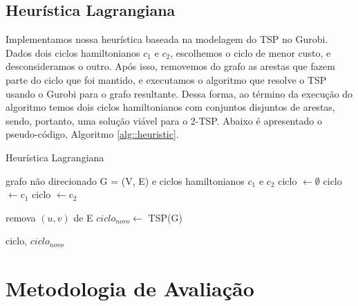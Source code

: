 \documentclass{TEMA}
\begin{document}
\subsection{Heurística Lagrangiana}

Implementamos nossa heurística baseada na modelagem do TSP no Gurobi. Dados dois ciclos hamiltonianos $c_1$ e $c_2$, escolhemos o ciclo de menor custo, e desconsideramos o outro. Após isso, removemos do grafo as arestas que fazem parte do ciclo que foi mantido, e executamos o algoritmo que resolve o TSP usando o Gurobi para o grafo resultante. Dessa forma, ao término da execução do algoritmo temos dois ciclos hamiltonianos com conjuntos disjuntos de arestas, sendo, portanto, uma solução viável para o 2-TSP. Abaixo é apresentado o pseudo-código, Algoritmo \ref{alg::heuristic}.

\begin{algorithm}[H]
    \label{alg::heuristic}
    \caption{Heurística Lagrangiana}
    \begin{algorithmic}[1]
        \REQUIRE grafo não direcionado G = (V, E) e ciclos hamiltonianos $c_1$ e $c_2$
        \STATE ciclo $\leftarrow \emptyset$
            \STATE ciclo $\leftarrow c_1$
        \ELSE
            \STATE ciclo $\leftarrow c_2$
        \ENDIF
        
            \STATE remova $(u, v)$ de E
        \ENDFOR
        \STATE $ciclo_{novo} \leftarrow$ TSP(G)
        
        \RETURN ciclo, $ciclo_{novo}$
        
    \end{algorithmic}
\end{algorithm}




\section{Metodologia de Avaliação}
\end{document}
